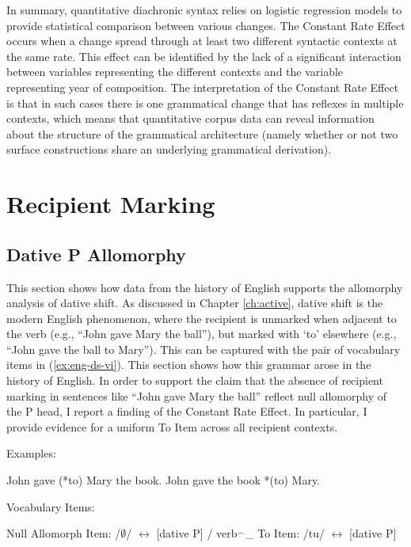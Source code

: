 	In summary, quantitative diachronic syntax relies on logistic regression models to provide statistical comparison between various changes. The Constant Rate Effect occurs when a change spread through at least two different syntactic contexts at the same rate. This effect can be identified by the lack of a significant interaction between variables representing the different contexts and the variable representing year of composition. The interpretation of the Constant Rate Effect is that in such cases there is one grammatical change that has reflexes in multiple contexts, which means that quantitative corpus data can reveal information about the structure of the grammatical architecture (namely whether or not two surface constructions share an underlying grammatical derivation).

\section{Recipient Marking}
\subsection{Dative P Allomorphy}
This section shows how data from the history of English supports the allomorphy analysis of dative shift. As discussed in Chapter \ref{ch:active}, dative shift is the modern English phenomenon, where the recipient is unmarked when adjacent to the verb (e.g., ``John gave Mary the ball''), but marked with `to' elsewhere (e.g., ``John gave the ball to Mary''). This can be captured with the pair of vocabulary items in (\ref{ex:eng-ds-vi}). This section shows how this grammar arose in the history of English. In order to support the claim that the absence of recipient marking in sentences like ``John gave Mary the ball'' reflect null allomorphy of the P head, I report a finding of the Constant Rate Effect. In particular, I provide evidence for a uniform To Item across all recipient contexts.  

	\begin{exe}
		\ex Examples:
		\begin{xlist}
			\ex John gave (*to) Mary the book.
			\ex John gave the book *(to) Mary.
		\end{xlist}
		\ex Vocabulary Items:\label{ex:eng-ds-vi}
		\begin{xlist}
			\ex Null Allomorph Item: /$\emptyset$/ $\leftrightarrow$ [dative P] / verb$^{\smallfrown}$\_
			\ex To Item: /tu/ $\leftrightarrow$ [dative P]
		\end{xlist}
	\end{exe}

